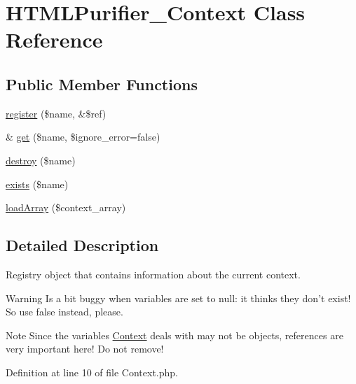 \hypertarget{classHTMLPurifier__Context}{\section{H\+T\+M\+L\+Purifier\+\_\+\+Context Class Reference}
\label{classHTMLPurifier__Context}
}
\subsection*{Public Member Functions}
\begin{DoxyCompactItemize}
\item 
\hyperlink{classHTMLPurifier__Context_a248995bf01616b87691352780968d44b}{register} (\$name, \&\$ref)
\item 
\& \hyperlink{classHTMLPurifier__Context_abd6d7e1f5717c459e542d71ef30533c6}{get} (\$name, \$ignore\+\_\+error=false)
\item 
\hyperlink{classHTMLPurifier__Context_a48dd64e93fa4621c552ae854209edbe4}{destroy} (\$name)
\item 
\hyperlink{classHTMLPurifier__Context_a569f4aedc926d27f23edaaad0e7c821c}{exists} (\$name)
\item 
\hyperlink{classHTMLPurifier__Context_a587376773e994720836c5114bbc0f6e3}{load\+Array} (\$context\+\_\+array)
\end{DoxyCompactItemize}


\subsection{Detailed Description}
Registry object that contains information about the current context. \begin{DoxyWarning}{Warning}
Is a bit buggy when variables are set to null\+: it thinks they don't exist! So use false instead, please. 
\end{DoxyWarning}
\begin{DoxyNote}{Note}
Since the variables \hyperlink{classContext}{Context} deals with may not be objects, references are very important here! Do not remove! 
\end{DoxyNote}


Definition at line 10 of file Context.\+php.



